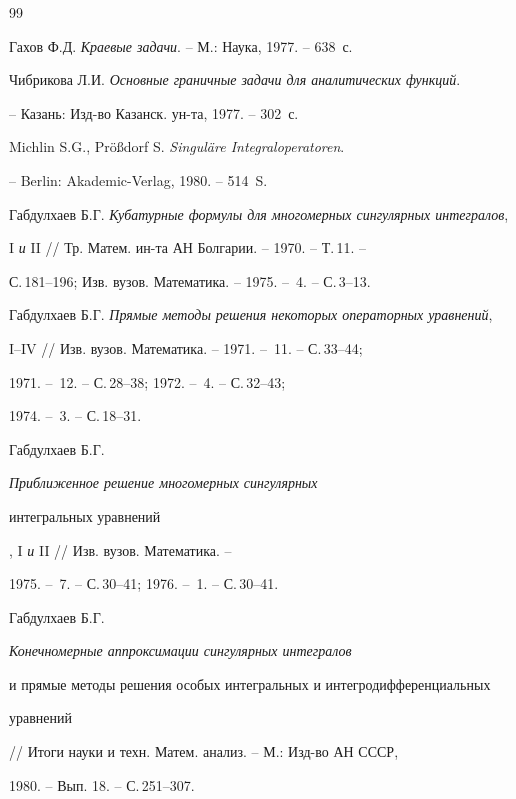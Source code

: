 \begin{thebibliography}{99}







Гахов Ф.Д. {\em Краевые задачи}. -- М.: Наука, 1977. -- 638~с.




Чибрикова Л.И. {\em Основные граничные задачи для аналитических функций}.


-- Казань: Изд-во Казанск. ун-та, 1977. -- 302~с.




Michlin S.G., Pr\"{o}\ss{}dorf S. {\em Singul\"{a}re Integraloperatoren}.


-- Berlin: Akademic-Verlag, 1980. -- 514~S.




Габдулхаев Б.Г. {\em Кубатурные формулы для многомерных сингулярных интегралов},


I {\it и} II // Тр. Матем. ин-та АН Болгарии. -- 1970. -- Т.\,11. --


С.\,181--196; Изв. вузов. Математика. -- 1975. -- \No\,4. -- С.\,3--13.




Габдулхаев Б.Г. {\em Прямые методы решения некоторых операторных уравнений},


I--IV // Изв. вузов. Математика. -- 1971. -- \No\,11. -- С.\,33--44;


1971. -- \No\,12. -- С.\,28--38; 1972. -- \No\,4. -- С.\,32--43;


1974. -- \No\,3. -- С.\,18--31.




Габдулхаев Б.Г. {\em Приближенное решение многомерных сингулярных 


интегральных уравнений}, I {\it и} II // Изв. вузов. Математика. -- 


1975. -- \No\,7. -- С.\,30--41; 1976. -- \No\,1. -- С.\,30--41.




Габдулхаев Б.Г. {\em Конечномерные аппроксимации сингулярных интегралов 


и прямые методы решения особых интегральных и интегродифференциальных 


уравнений} // Итоги науки и техн. Матем. анализ. -- М.: Изд-во АН СССР, 


1980. -- Вып. 18. -- С.\,251--307.





\end{thebibliography}
